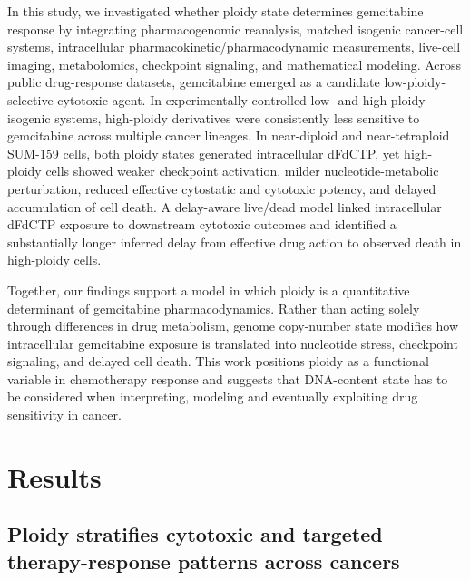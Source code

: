 \documentclass[11pt,notitlepage]{article}
\begin{document}
In this study, we investigated whether ploidy state determines gemcitabine response by integrating pharmacogenomic reanalysis, matched isogenic cancer-cell systems, intracellular pharmacokinetic/pharmacodynamic measurements, live-cell imaging, metabolomics, checkpoint signaling, and mathematical modeling. Across public drug-response datasets, gemcitabine emerged as a candidate low-ploidy-selective cytotoxic agent. In experimentally controlled low- and high-ploidy isogenic systems, high-ploidy derivatives were consistently less sensitive to gemcitabine across multiple cancer lineages. In near-diploid and near-tetraploid SUM-159 cells, both ploidy states generated intracellular dFdCTP, yet high-ploidy cells showed weaker checkpoint activation, milder nucleotide-metabolic perturbation, reduced effective cytostatic and cytotoxic potency, and delayed accumulation of cell death. A delay-aware live/dead model linked intracellular dFdCTP exposure to downstream cytotoxic outcomes and identified a substantially longer inferred delay from effective drug action to observed death in high-ploidy cells.

Together, our findings support a model in which ploidy is a quantitative determinant of gemcitabine pharmacodynamics. Rather than acting solely through differences in drug metabolism, genome copy-number state modifies how intracellular gemcitabine exposure is translated into nucleotide stress, checkpoint signaling, and delayed cell death. This work positions ploidy as a functional variable in chemotherapy response and suggests that DNA-content state has to be considered when interpreting, modeling and eventually exploiting drug sensitivity in cancer.


\section*{Results}
  \subsection*{Ploidy stratifies cytotoxic and targeted therapy-response patterns across cancers} 
\end{document}
